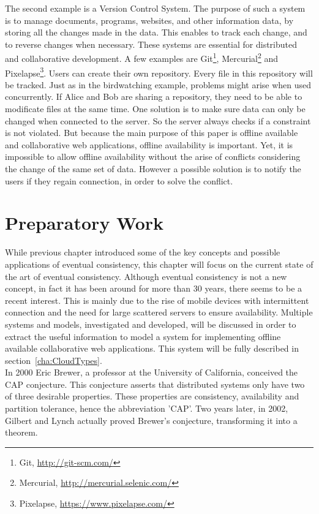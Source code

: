 \documentclass[a4paper,12pt]{report}
\begin{document}
The second example is a Version Control System. The purpose of such a system is to manage documents, programs, websites, and other information data, by storing all the changes made in the data. This enables to track each change, and to reverse changes when necessary. These systems are essential for distributed and collaborative development. A few examples are Git\footnote{Git, \url{http://git-scm.com/}}, Mercurial\footnote{Mercurial, \url{http://mercurial.selenic.com/}} and Pixelapse\footnote{Pixelapse, \url{https://www.pixelapse.com/}}. Users can create their own repository. Every file in this repository will be tracked. Just as in the birdwatching example, problems might arise when used concurrently. If Alice and Bob are sharing a repository, they need to be able to modificate files at the same time. One solution is to make sure data can only be changed when connected to the server. So the server always checks if a constraint is not violated. But because the main purpose of this paper is offline available and collaborative web applications, offline availability is important. Yet, it is impossible to allow offline availability without the arise of conflicts considering the change of the same set of data. However a possible solution is to notify the users if they regain connection, in order to solve the conflict. 

\chapter{Preparatory Work}\label{cha:StateOfTheArt} %

While previous chapter introduced some of the key concepts and possible applications of eventual consistency, this chapter will focus on the current state of the art of eventual consistency. Although eventual consistency is not a new concept, in fact it has been around for more than 30 years, there seems to be a recent interest. This is mainly due to the rise of mobile devices with intermittent connection and the need for large scattered servers to ensure availability. Multiple systems and models, investigated and developed, will be discussed in order to extract the useful information to model a system for implementing offline available collaborative web applications. This system will be fully described in section~\ref{cha:CloudTypes}. \\

In 2000 Eric Brewer, a professor at the University of California, conceived the CAP conjecture. This conjecture asserts that distributed systems only have two of three desirable properties. These properties are consistency, availability and partition tolerance, hence the abbreviation 'CAP'. Two years later, in 2002, Gilbert and Lynch actually proved Brewer's conjecture, transforming it into a theorem.
\end{document}
